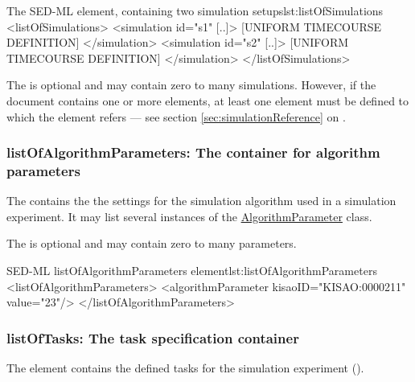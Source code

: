 

%
\begin{myXmlLst}{The SED-ML  element, containing two simulation setups}{lst:listOfSimulations}
 <listOfSimulations>
  <simulation id="s1" [..]>
   [UNIFORM TIMECOURSE DEFINITION]
  </simulation>
  <simulation id="s2" [..]>
   [UNIFORM TIMECOURSE DEFINITION]
  </simulation>
 </listOfSimulations>
\end{myXmlLst}

The  is optional and may contain zero to many simulations. However, if the \currentLV document contains one or more  elements, at least one  element must be defined to which  the  element refers --- see section \ref{sec:simulationReference} on .


\subsubsection{listOfAlgorithmParameters: The container for algorithm parameters}
\label{sec:listOfAlgorithmParameters}
The  contains the the settings for the simulation algorithm used in a simulation experiment. It may list several instances of the \hyperref[class:algorithmParameter]{AlgorithmParameter} class.

The  is optional and may contain zero to many parameters. 

\begin{myXmlLst}{SED-ML listOfAlgorithmParameters element}{lst:listOfAlgorithmParameters}
<listOfAlgorithmParameters>
  <algorithmParameter kisaoID="KISAO:0000211" value="23"/> 
</listOfAlgorithmParameters>
\end{myXmlLst}

 
\subsubsection{listOfTasks: The task specification container}
\label{sec:listOfTasks}
The  element contains the defined tasks for the simulation experiment ().


